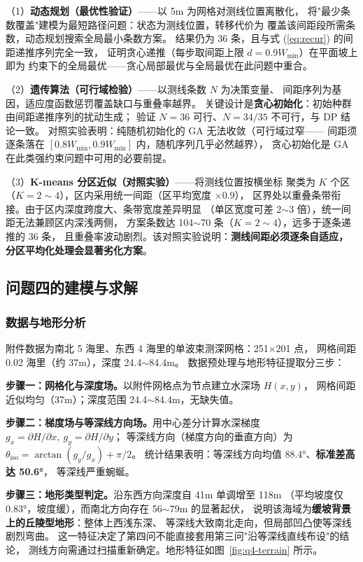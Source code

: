 \documentclass[withoutpreface,bwprint]{cumcmthesis} %
\begin{document}
（1）\textbf{动态规划（最优性验证）}——以 5m 为网格对测线位置离散化，
将"最少条数覆盖"建模为最短路径问题：状态为测线位置，转移代价为
覆盖该间距段所需条数，动态规划搜索全局最小条数方案。
结果仍为 36 条，且与式 (\ref{eq:recur}) 的间距递推序列完全一致，
证明贪心递推（每步取间距上限 $d=0.9W_{\min}$）在平面坡上即为
约束下的全局最优——贪心局部最优与全局最优在此问题中重合。

（2）\textbf{遗传算法（可行域检验）}——以测线条数 $N$ 为决策变量、
间距序列为基因，适应度函数惩罚覆盖缺口与重叠率越界。
关键设计是\textbf{贪心初始化}：初始种群由间距递推序列的扰动生成；
验证 $N=36$ 可行、$N=34/35$ 不可行，与 DP 结论一致。
对照实验表明：纯随机初始化的 GA 无法收敛（可行域过窄——
间距须逐条落在 $[0.8W_{\min},0.9W_{\min}]$ 内，随机序列几乎必然越界），
贪心初始化是 GA 在此类强约束问题中可用的必要前提。

（3）\textbf{K-means 分区近似（对照实验）}——将测线位置按横坐标
聚类为 $K$ 个区（$K=2\sim4$），区内采用统一间距（区平均宽度 $\times0.9$），
区界处以重叠条带衔接。由于区内深度跨度大、条带宽度差异明显
（单区宽度可差 2$\sim$3 倍），统一间距无法兼顾区内深浅两侧，
方案条数达 104$\sim$70 条（$K=2\sim4$），远多于逐条递推的 36 条，
且重叠率波动剧烈。该对照实验说明：\textbf{测线间距必须逐条自适应，
分区平均化处理会显著劣化方案}。

\subsection{问题四的建模与求解}

\subsubsection{数据与地形分析}

附件数据为南北 5 海里、东西 4 海里的单波束测深网格：251$\times$201 点，
网格间距 0.02 海里（约 37m），深度 24.4$\sim$84.4m。
数据预处理与地形特征提取分三步：

\textbf{步骤一：网格化与深度场。}以附件网格点为节点建立水深场 $H(x,y)$，
网格间距近似均匀（37m）；深度范围 24.4$\sim$84.4m，无缺失值。

\textbf{步骤二：梯度场与等深线方向场。}用中心差分计算水深梯度
$g_x=\partial H/\partial x,\ g_y=\partial H/\partial y$；
等深线方向（梯度方向的垂直方向）为 $\theta_{\text{iso}}=\arctan(g_y/g_x)+\pi/2$。
统计结果表明：等深线方向均值 88.4°、\textbf{标准差高达 50.6°}，
等深线严重蜿蜒。

\textbf{步骤三：地形类型判定。}沿东西方向深度自 41m 单调增至 118m
（平均坡度仅 0.83°，坡度缓），而南北方向存在 56$\sim$79m 的显著起伏，
说明该海域为\textbf{缓坡背景上的丘陵型地形}：整体上西浅东深、
等深线大致南北走向，但局部凹凸使等深线剧烈弯曲。
这一特征决定了第四问不能直接套用第三问"沿等深线直线布设"的结论，
测线方向需通过扫描重新确定。地形特征如图~\ref{fig:q4-terrain} 所示。
\end{document}
